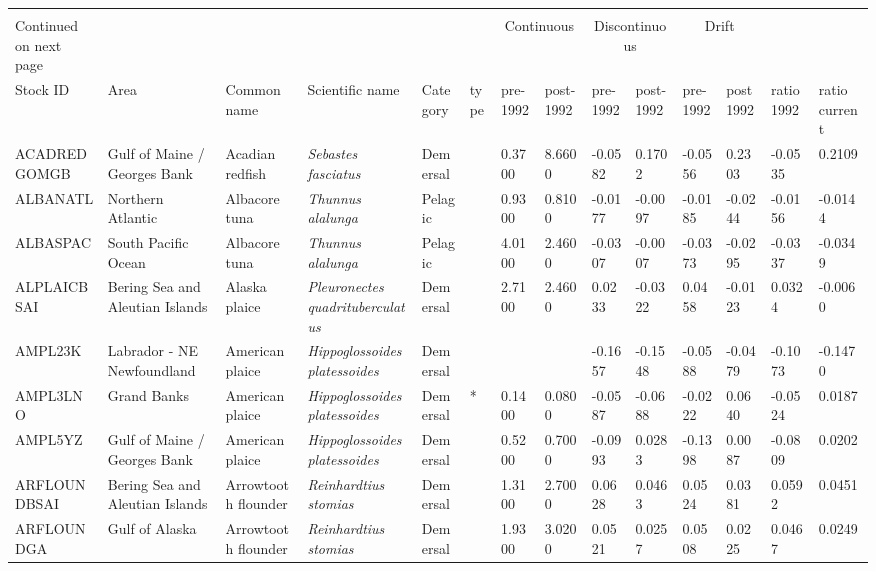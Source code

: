 \begin{longtable}{p{2.8cm}p{2cm}p{1.7cm}p{1.7cm}p{1cm}p{0.3cm}p{1cm}p{1cm}p{1cm}p{1cm}p{1cm}p{1cm}p{1cm}p{1cm}}
  \bottomrule \\ Continued on next page \endfoot
 \toprule  & & & & & &  \multicolumn{2}{c}{Continuous} & \multicolumn{2}{c}{Discontinuous} & \multicolumn{2}{c}{Drift} & & \\ 
\cmidrule{7-12}
 Stock ID & Area & Common name & Scientific name & Category & type & pre-1992 & post-1992 & pre-1992 & post-1992 & pre-1992 & post1992 & ratio 1992 & ratio current \\ \midrule \endhead
ACADREDGOMGB & Gulf of Maine / Georges Bank & Acadian redfish & \textit{Sebastes fasciatus} & Demersal &   & 0.3700 & 8.6600 & -0.0582 & 0.1702 & -0.0556 & 0.2303 & -0.0535 & 0.2109 \\ 
  ALBANATL & Northern Atlantic & Albacore tuna & \textit{Thunnus alalunga} & Pelagic &   & 0.9300 & 0.8100 & -0.0177 & -0.0097 & -0.0185 & -0.0244 & -0.0156 & -0.0144 \\ 
  ALBASPAC & South Pacific Ocean & Albacore tuna & \textit{Thunnus alalunga} & Pelagic &   & 4.0100 & 2.4600 & -0.0307 & -0.0007 & -0.0373 & -0.0295 & -0.0337 & -0.0349 \\ 
  ALPLAICBSAI & Bering Sea and Aleutian Islands & Alaska plaice & \textit{Pleuronectes quadrituberculatus} & Demersal &   & 2.7100 & 2.4600 & 0.0233 & -0.0322 & 0.0458 & -0.0123 & 0.0324 & -0.0060 \\ 
  AMPL23K & Labrador - NE Newfoundland & American plaice & \textit{Hippoglossoides platessoides} & Demersal &  &  &  & -0.1657 & -0.1548 & -0.0588 & -0.0479 & -0.1073 & -0.1470 \\ 
  AMPL3LNO & Grand Banks & American plaice & \textit{Hippoglossoides platessoides} & Demersal & * & 0.1400 & 0.0800 & -0.0587 & -0.0688 & -0.0222 & 0.0640 & -0.0524 & 0.0187 \\ 
  AMPL5YZ & Gulf of Maine / Georges Bank & American plaice & \textit{Hippoglossoides platessoides} & Demersal &   & 0.5200 & 0.7000 & -0.0993 & 0.0283 & -0.1398 & 0.0087 & -0.0809 & 0.0202 \\ 
  ARFLOUNDBSAI & Bering Sea and Aleutian Islands & Arrowtooth flounder & \textit{Reinhardtius stomias} & Demersal &   & 1.3100 & 2.7000 & 0.0628 & 0.0463 & 0.0524 & 0.0381 & 0.0592 & 0.0451 \\ 
  ARFLOUNDGA & Gulf of Alaska & Arrowtooth flounder & \textit{Reinhardtius stomias} & Demersal &   & 1.9300 & 3.0200 & 0.0521 & 0.0257 & 0.0508 & 0.0225 & 0.0467 & 0.0249 \\ 

\end{longtable}
